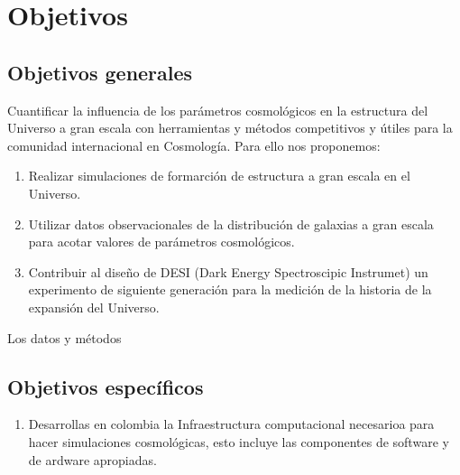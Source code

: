 \section{Objetivos}

\subsection{Objetivos generales} 

Cuantificar la influencia de los par\'ametros cosmol\'ogicos en la
  estructura del Universo a gran escala con herramientas y m\'etodos competitivos y \'utiles para la comunidad internacional en Cosmolog\'ia. Para ello nos proponemos:

\begin{enumerate}
\item  Realizar simulaciones de formarci\'on de estructura a gran escala en el Universo.
\item Utilizar datos observacionales de la distribuci\'on de galaxias a gran escala para acotar valores de par\'ametros cosmol\'ogicos.
\item Contribuir al dise\~no de DESI (Dark Energy Spectroscipic Instrumet) un experimento de siguiente generaci\'on para la medici\'on de la historia de la expansi\'on del Universo. 
\end{enumerate}

Los datos y m\'etodos 

\subsection{Objetivos espec\'ificos}


\begin{enumerate}
\item Desarrollas en colombia la Infraestructura computacional necesarioa para hacer simulaciones cosmol\'ogicas, esto incluye las componentes de software y de ardware apropiadas.
\end{enumerate}
